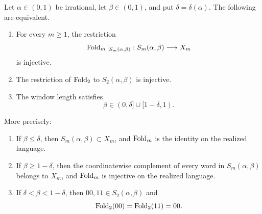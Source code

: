 \begin{theorem}
\label{thm:window-injectivity-classification}
Let \(\alpha\in(0,1)\) be irrational, let \(\beta\in(0,1)\), and put
\(\delta=\delta(\alpha)\).  The following are equivalent.
\begin{enumerate}
\item For every \(m\geq1\), the restriction
\[
\operatorname{Fold}_m|_{S_m(\alpha,\beta)}:S_m(\alpha,\beta)\longrightarrow X_m
\]
is injective.
\item The restriction of \(\operatorname{Fold}_2\) to \(S_2(\alpha,\beta)\) is injective.
\item The window length satisfies
\[
\beta\in(0,\delta]\cup[1-\delta,1).
\]
\end{enumerate}
More precisely:
\begin{enumerate}
\item[(a)] If \(\beta\leq\delta\), then
\(S_m(\alpha,\beta)\subset X_m\), and \(\operatorname{Fold}_m\) is the identity on the
realized language.
\item[(b)] If \(\beta\geq1-\delta\), then the coordinatewise complement of
every word in \(S_m(\alpha,\beta)\) belongs to \(X_m\), and \(\operatorname{Fold}_m\) is
injective on the realized language.
\item[(c)] If \(\delta<\beta<1-\delta\), then
\(00,11\in S_2(\alpha,\beta)\) and
\[
\operatorname{Fold}_2(00)=\operatorname{Fold}_2(11)=00.
\]
\end{enumerate}
\end{theorem}

